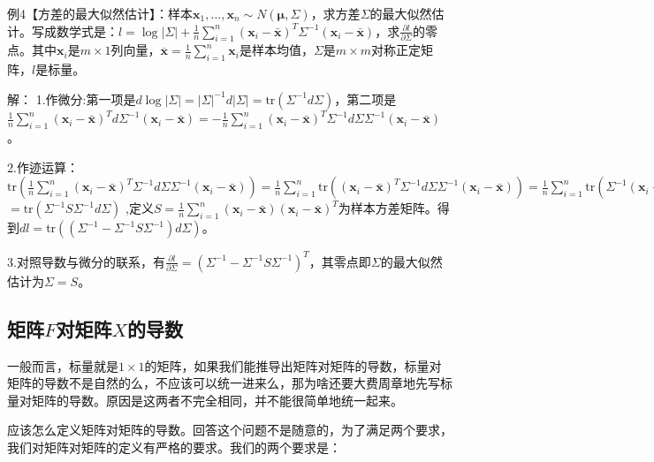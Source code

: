 \documentclass[UTF8]{ctexart}
\begin{document}
		\noindent 例4【方差的最大似然估计】：样本$\boldsymbol{x}_1,\dots, \boldsymbol{x}_n\sim N(\boldsymbol{\mu}, \Sigma)$，求方差$\Sigma$的最大似然估计。写成数学式是：$l = \log|\Sigma|+\frac{1}{n}\sum_{i=1}^n(\boldsymbol{x}_i-\boldsymbol{\bar{x}})^T\Sigma^{-1}(\boldsymbol{x}_i-\boldsymbol{\bar{x}})$，求$\frac{\partial l }{\partial \Sigma}$的零点。其中$\boldsymbol{x}_i$是$m\times 1$列向量，$\overline{\boldsymbol{x}}=\frac{1}{n}\sum_{i=1}^n \boldsymbol{x}_i$是样本均值，$\Sigma$是$m\times m$对称正定矩阵，$l$是标量。

		\noindent 解：
		1.作微分:第一项是$d\log|\Sigma| = |\Sigma|^{-1}d|\Sigma| = \text{tr}(\Sigma^{-1}d\Sigma)$，第二项是$\frac{1}{n}\sum_{i=1}^n(\boldsymbol{x}_i-\boldsymbol{\bar{x}})^Td\Sigma^{-1}(\boldsymbol{x}_i-\boldsymbol{\bar{x}}) = -\frac{1}{n}\sum_{i=1}^n(\boldsymbol{x}_i-\boldsymbol{\bar{x}})^T\Sigma^{-1}d\Sigma\Sigma^{-1}(\boldsymbol{x}_i-\boldsymbol{\bar{x}})$。

		2.作迹运算：$\text{tr}\left(\frac{1}{n}\sum_{i=1}^n(\boldsymbol{x}_i-\boldsymbol{\bar{x}})^T\Sigma^{-1}d\Sigma\Sigma^{-1}(\boldsymbol{x}_i-\boldsymbol{\bar{x}})\right) = \frac{1}{n} \sum_{i=1}^n \text{tr}((\boldsymbol{x}_i-\boldsymbol{\bar{x}})^T\Sigma^{-1} d\Sigma \Sigma^{-1}(\boldsymbol{x}_i-\boldsymbol{\bar{x}}))= \frac{1}{n}\sum_{i=1}^n\text{tr}\left(\Sigma^{-1}(\boldsymbol{x}_i-\boldsymbol{\bar{x}})(\boldsymbol{x}_i-\boldsymbol{\bar{x}})^T\Sigma^{-1}d\Sigma\right)$\\
		$=\text{tr}(\Sigma^{-1}S\Sigma^{-1}d\Sigma)$
		,定义$S = \frac{1}{n}\sum_{i=1}^n(\boldsymbol{x}_i-\boldsymbol{\bar{x}})(\boldsymbol{x}_i-\boldsymbol{\bar{x}})^T$为样本方差矩阵。得到$dl = \text{tr}\left(\left(\Sigma^{-1}-\Sigma^{-1}S\Sigma^{-1}\right)d\Sigma\right)$。

		3.对照导数与微分的联系，有$\frac{\partial l }{\partial \Sigma}=(\Sigma^{-1}-\Sigma^{-1}S\Sigma^{-1})^T$，其零点即$\Sigma$的最大似然估计为$\Sigma = S$。

	\subsection*{矩阵$F$对矩阵$X$的导数}
		一般而言，标量就是$1\times1$的矩阵，如果我们能推导出矩阵对矩阵的导数，标量对矩阵的导数不是自然的么，不应该可以统一进来么，那为啥还要大费周章地先写标量对矩阵的导数。原因是这两者不完全相同，并不能很简单地统一起来。

		应该怎么定义矩阵对矩阵的导数。回答这个问题不是随意的，为了满足两个要求，我们对矩阵对矩阵的定义有严格的要求。我们的两个要求是：
\end{document}
